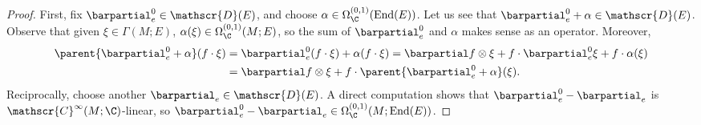\begin{proof}
    First, fix \(\barpartial_{e}^0 \in \mathscr{D}(E)\), and choose \(\alpha \in \Omega_\C^{(0,1)}(\mathrm{End}(E))\). Let us see that \(\barpartial^0_e + \alpha \in \mathscr{D}(E)\). Observe that given \(\xi \in \Gamma(M;E)\), \(\alpha(\xi)\in \Omega_\C^{(0,1)}(M;E)\), so the sum of \(\barpartial_e^0\) and \(\alpha\) makes sense as an operator. Moreover,
    \begin{align*}
        \parent{\barpartial_e^0 + \alpha}(f\cdot  \xi) & = \barpartial_e^0(f \cdot \xi) + \alpha(f \cdot \xi) = \barpartial f \otimes \xi + f \cdot \barpartial_e^0 \xi + f \cdot \alpha(\xi) \\
        & = \barpartial f \otimes \xi + f \cdot \parent{\barpartial_e^0+\alpha}(\xi).
    \end{align*}
    Reciprocally, choose another \(\barpartial_e \in \mathscr{D}(E)\). A direct computation shows that \(\barpartial_e^0-\barpartial_e\) is \(\mathscr{C}^\infty(M;\C)\)-linear, so \(\barpartial_e^0-\barpartial_e\in \Omega_\C^{(0,1)}(M;\mathrm{End}(E))\).
\end{proof}


